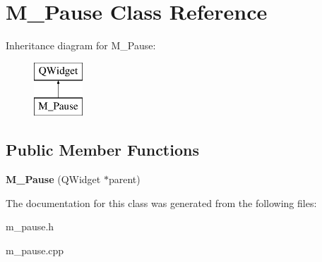\hypertarget{class_m___pause}{}\section{M\+\_\+\+Pause Class Reference}
\label{class_m___pause}
Inheritance diagram for M\+\_\+\+Pause\+:\begin{figure}[H]
\begin{center}
\leavevmode
\includegraphics[height=2.000000cm]{class_m___pause}
\end{center}
\end{figure}
\subsection*{Public Member Functions}
\begin{DoxyCompactItemize}
\item 
\hypertarget{class_m___pause_ac1cb95e28d9c158d4dfdba4a08491432}{}{\bfseries M\+\_\+\+Pause} (Q\+Widget $\ast$parent)\label{class_m___pause_ac1cb95e28d9c158d4dfdba4a08491432}

\end{DoxyCompactItemize}


The documentation for this class was generated from the following files\+:\begin{DoxyCompactItemize}
\item 
m\+\_\+pause.\+h\item 
m\+\_\+pause.\+cpp\end{DoxyCompactItemize}
